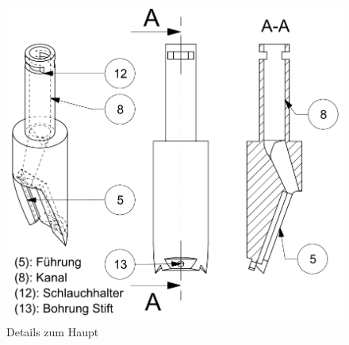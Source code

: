 	\begin{figure}[H]
	\includegraphics[scale=0.62]{Illustrationen/6-Umsetzung/details_haupt.PNG}
	\caption{Details zum Haupt}
	\label{fig:details_haupt}
	\end{figure}

